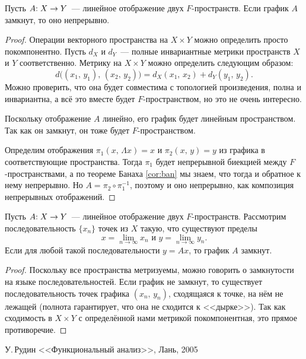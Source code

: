 \documentclass{notes}
\begin{document}
	\begin{thm}
		Пусть $A\text{\text{:}} \; X \to Y$~--- линейное отображение двух $F$-пространств. Если график $A$ замкнут, то оно непрерывно.
		\begin{proof}
			Операции векторного пространства на $X \times Y$ можно определить просто покомпонентно. Пусть $d_X$ и $d_Y$~--- полные инвариантные метрики пространств $X$ и $Y$ соответственно. Метрику на $X \times Y$ можно определить следующим образом:
			\[
				d\big((x_1, \, y_1), \, (x_2, \, y_2)\big) = d_X(x_1, \, x_2) + d_Y(y_1, \, y_2).
			\]
			Можно проверить, что она будет совместима с топологией произведения, полна и инвариантна, а всё это вместе будет $F$-пространством, но это не очень интересно.

			Поскольку отображение $A$ линейно, его график будет линейным пространством. Так как он замкнут, он тоже будет $F$-пространством.

			Определим отображения $\pi_1(x, \, \Lambda x) = x$ и $\pi_2(x, \, y) = y$ из графика в соответствующие пространства. Тогда $\pi_1$ будет непрерывной биекцией между $F$-пространствами, а по теореме Банаха \ref{cor:ban} мы знаем, что тогда и обратное к нему непрерывно. Но $A = \pi_2 \circ \pi_1^{-1}$, поэтому и оно непрерывно, как композиция непрерывных отображений.
		\end{proof}
	\end{thm}

	\begin{st}
		Пусть $A\text{\text{:}} \; X \to Y$~--- линейное отображение двух $F$-пространств. Рассмотрим последовательность $\{x_n\}$ точек из $X$ такую, что существуют пределы
		\[
			x = \lim\limits_{n \to \infty} x_n \text{ и } y = \lim\limits_{n \to \infty} y_n.
		\]
		Если для любой такой последовательности $y = Ax$, то график $A$ замкнут.
		\begin{proof}
			Поскольку все пространства метризуемы, можно говорить о замкнутости на языке последовательностей. Если график не замкнут, то существует последовательность точек графика $(x_n, \, y_n)$, сходящаяся к точке, на нём не лежащей (полнота гарантирует, что она не сходится к <<дырке>>). Так как сходимость в $X \times Y$ с определённой нами метрикой покомпонентная, это прямое противоречие.			
		\end{proof}
	\end{st}


\begin{thebibliography}{}

 У.$\,$Рудин <<Функциональный анализ>>, Лань, 2005

\end{thebibliography}{}
\end{document}
